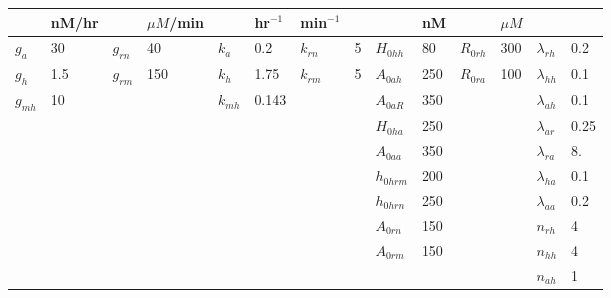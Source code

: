 \documentclass{article}
\begin{document}
\begin{table}[]
\begin{tabular}{ll|ll|ll|ll|ll|ll|ll}
                & nM/hr &               & $\mu M$/min   &               & hr$^{-1}$     & min$^{-1}$    &       &               & nM    &               & $\mu M$       &                       & \\
\hline
$g_a$           & 30    & $g_{rn}$      & 40            & $k_a$         & 0.2           & $k_{rn}$      & 5     & $H_{0hh}$     & 80    &  $R_{0rh}$    & 300           & $\lambda_{rh}$        & 0.2   \\
$g_h$           & 1.5   & $g_{rm}$      & 150           & $k_h$         & 1.75          & $k_{rm}$      & 5     & $A_{0ah}$     & 250   &  $R_{0ra}$    & 100           & $\lambda_{hh}$        & 0.1   \\
$g_{mh}$        & 10    &               &               & $k_{mh}$      & 0.143         &               &       & $A_{0aR}$     & 350   &               &               & $\lambda_{ah}$        & 0.1   \\
                &       &               &               &               &               &               &       & $H_{0ha}$     & 250   &               &               & $\lambda_{ar}$        & 0.25  \\
                &       &               &               &               &               &               &       & $A_{0aa}$     & 350   &               &               & $\lambda_{ra}$        & 8.    \\
                &       &               &               &               &               &               &       & $h_{0hrm}$    & 200   &               &               & $\lambda_{ha}$        & 0.1   \\
                &       &               &               &               &               &               &       & $h_{0hrn}$    & 250   &               &               & $\lambda_{aa}$        & 0.2   \\
                &       &               &               &               &               &               &       & $A_{0rn}$     & 150   &               &               & $n_{rh}$      & 4     \\
                &       &               &               &               &               &               &       & $A_{0rm}$     & 150   &               &               & $n_{hh}$      & 4     \\
                &       &               &               &               &               &               &       &               &       &               &               & $n_{ah}$      & 1     \\

\end{tabular}
\end{table}
\end{document}
